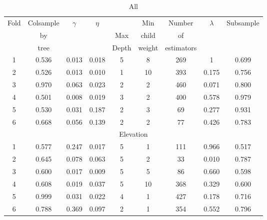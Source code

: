 \begin{table}[!htbp]
    \centering
    \caption{All}
    \begin{tabular}{ccccccccc}
        \toprule
        \multirow{3}{*}{Fold} &  Colsample &  \multirow{3}{*}{$\gamma$} &  \multirow{3}{*}{$\eta$} &   &  Min &  Number &  \multirow{3}{*}{$\lambda$} &  \multirow{3}{*}{Subsample} \\
         & by   & & & Max   & child  & of         & & \\
         & tree & & & Depth & weight & estimators & & \\
        \midrule
        1 &   0.536 &  0.013 &          0.018 &      5 &             8 &       269 &       1 &      0.699 \\
        2 &   0.526 &  0.013 &          0.010 &      1 &            10 &       393 &       0.175 &      0.756 \\
        3 &   0.970 &  0.063 &          0.023 &      2 &             2 &       460 &       0.071 &      0.800 \\
        4 &   0.501 &  0.008 &          0.019 &      3 &             2 &       400 &       0.578 &      0.979 \\
        5 &   0.530 &  0.031 &          0.187 &      2 &             3 &        69 &       0.277 &      0.931 \\
        6 &   0.668 &  0.056 &          0.139 &      2 &             2 &        77 &       0.426 &      0.783 \\
        \hline
        \multicolumn{9}{c}{Elevation} \\
        \cmidrule{1-9}
        1 &   0.577 &  0.247 &          0.017 &      5 &             1 &       111 &       0.966 &      0.517 \\
        2 &   0.645 &  0.078 &          0.063 &      5 &             2 &        33 &       0.010 &      0.787 \\
        3 &   0.600 &  0.017 &          0.009 &      5 &             5 &        86 &       0.660 &      0.598 \\
        4 &   0.608 &  0.019 &          0.037 &      5 &            10 &       368 &       0.329 &      0.600 \\
        5 &   0.999 &  0.031 &          0.022 &      4 &             1 &       427 &       0.178 &      0.716 \\
        6 &   0.788 &  0.369 &          0.097 &      2 &             1 &       354 &       0.552 &      0.796 \\
        \bottomrule
        \end{tabular}
\end{table}

